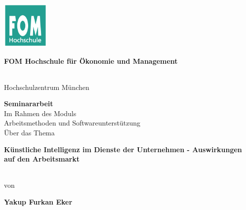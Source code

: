 \newcommand{\Thema}{Künstliche Intelligenz im Dienste der Unternehmen - Auswirkungen auf den Arbeitsmarkt}
\newcommand{\Name}{Yakup Furkan Eker}
\newcommand{\Gutachter}{Herr Dr. Bauer}
\newcommand{\Matrikelnummer}{594919}
\newcommand{\Abgabedatum}{10.01.2022}




\begin{titlepage}
	\begin{center}
		\includegraphics[width=2.3cm]{assets/fomLogo.pdf}\\
		\vspace{.5cm}
		\begin{Large}\textbf{FOM Hochschule für Ökonomie und Management}\end{Large}\\
		\vspace{.5cm}
		Hochschulzentrum München
																		
		\vspace{2cm}
	\end{center}
																						
	\bigskip	
																																														
	\begin{center}
		\textbf{Seminararbeit}\\
		\vspace{0.2cm}
		Im Rahmen des Moduls\\
		\vspace{0.5cm}
		Arbeitsmethoden und Softwareunterstützung\\
		\vspace{2cm}
		Über das Thema\\
		\vspace{0.5cm}
		\begin{Large}\textbf{\textbf{\Thema}}\end{Large}\\
																
		\vspace{2cm}
		von\\
		\vspace{0.5cm}
		\begin{Large}\textbf{\textbf{\Name}}\end{Large}\\
	\end{center}
																				

\end{titlepage}
